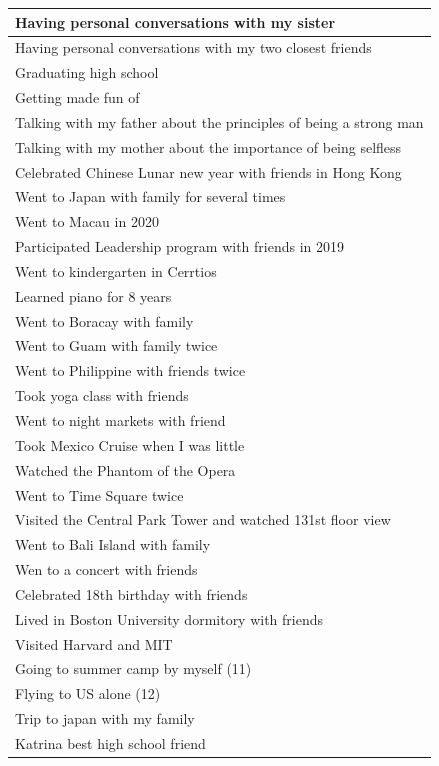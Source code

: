 \documentclass[
  .7em,
  letterpaper,
  DIV=11,
  numbers=noendperiod]{scrartcl}
\begin{document}
\begin{table}
\begin{tabular}{l}
\hline
Having personal conversations with my sister\\
\hline
Having personal conversations with my two closest friends\\
\hline
Graduating high school\\
\hline
Getting made fun of\\
\hline
Talking with my father about the principles of being a strong man\\
\hline
Talking with my mother about the importance of being selfless\\
\hline
Celebrated Chinese Lunar new year with friends in Hong Kong\\
\hline
Went to Japan with family for several times\\
\hline
Went to Macau in 2020\\
\hline
Participated Leadership program with friends in 2019\\
\hline
Went to kindergarten in Cerrtios\\
\hline
Learned piano for 8 years\\
\hline
Went to Boracay with family\\
\hline
Went to Guam with family twice\\
\hline
Went to Philippine with friends twice\\
\hline
Took yoga class with friends\\
\hline
Went to night markets with friend\\
\hline
Took Mexico Cruise when I was little\\
\hline
Watched the Phantom of the Opera\\
\hline
Went to Time Square twice\\
\hline
Visited the Central Park Tower and watched 131st floor view\\
\hline
Went to Bali Island with family\\
\hline
Wen to a concert with friends\\
\hline
Celebrated 18th birthday with friends\\
\hline
Lived in Boston University dormitory with friends\\
\hline
Visited Harvard and MIT\\
\hline
Going to summer camp by myself (11)\\
\hline
Flying to US alone (12)\\
\hline
Trip to japan with my family\\
\hline
Katrina best high school friend\\
\hline

\end{tabular}
\end{table}
\end{document}
